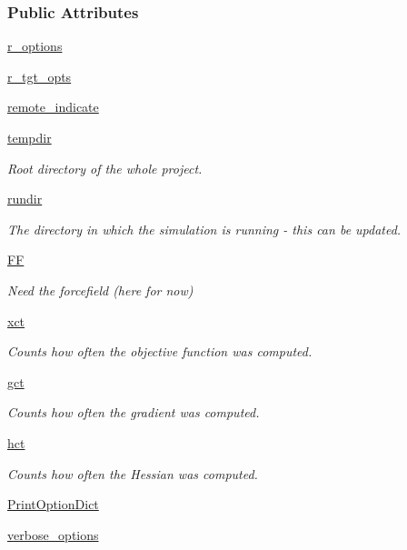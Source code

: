\subsubsection*{Public Attributes}
\begin{DoxyCompactItemize}
\item 
\hyperlink{classforcebalance_1_1target_1_1RemoteTarget_a29cbbe48b817f527628d68d844b36b1d}{r\-\_\-options}
\item 
\hyperlink{classforcebalance_1_1target_1_1RemoteTarget_a49d8b3e812fc2114c73fafeb5e8abe51}{r\-\_\-tgt\-\_\-opts}
\item 
\hyperlink{classforcebalance_1_1target_1_1RemoteTarget_a0c110e0c641b57839fb0b150cd3d3b63}{remote\-\_\-indicate}
\item 
\hyperlink{classforcebalance_1_1target_1_1Target_aa1f01b5b78db253b5b66384ed11ed193}{tempdir}
\begin{DoxyCompactList}\small\item\em Root directory of the whole project. \end{DoxyCompactList}\item 
\hyperlink{classforcebalance_1_1target_1_1Target_a6872de5b2d4273b82336ea5b0da29c9e}{rundir}
\begin{DoxyCompactList}\small\item\em The directory in which the simulation is running -\/ this can be updated. \end{DoxyCompactList}\item 
\hyperlink{classforcebalance_1_1target_1_1Target_a38a37919783141ea37fdcf8b00ce0aaf}{F\-F}
\begin{DoxyCompactList}\small\item\em Need the forcefield (here for now) \end{DoxyCompactList}\item 
\hyperlink{classforcebalance_1_1target_1_1Target_aad2e385cfbf7b4a68f1c2cb41133fe82}{xct}
\begin{DoxyCompactList}\small\item\em Counts how often the objective function was computed. \end{DoxyCompactList}\item 
\hyperlink{classforcebalance_1_1target_1_1Target_aa625ac88c6744eb14ef281d9496d0dbb}{gct}
\begin{DoxyCompactList}\small\item\em Counts how often the gradient was computed. \end{DoxyCompactList}\item 
\hyperlink{classforcebalance_1_1target_1_1Target_a5b5a42f78052b47f29ed4b940c6111a1}{hct}
\begin{DoxyCompactList}\small\item\em Counts how often the Hessian was computed. \end{DoxyCompactList}\item 
\hyperlink{classforcebalance_1_1BaseClass_afc6659278497d7245bc492ecf405ccae}{Print\-Option\-Dict}
\item 
\hyperlink{classforcebalance_1_1BaseClass_afd68efa29ccd2f320f4cf82198214aac}{verbose\-\_\-options}
\end{DoxyCompactItemize}


